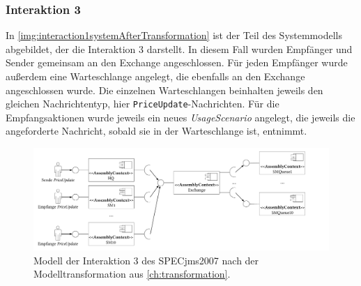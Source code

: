 \subsubsection{Interaktion 3}
In \autoref{img:interaction1systemAfterTransformation} ist der Teil des Systemmodells abgebildet, der die Interaktion 3 darstellt. In diesem Fall wurden Empfänger und Sender gemeinsam an den Exchange angeschlossen. Für jeden Empfänger wurde außerdem eine Warteschlange angelegt, die ebenfalls an den Exchange angeschlossen wurde. Die einzelnen Warteschlangen beinhalten jeweils den gleichen Nachrichtentyp, hier \texttt{PriceUpdate}-Nachrichten. Für die Empfangsaktionen wurde jeweils ein neues \emph{UsageScenario} angelegt, die jeweils die angeforderte Nachricht, sobald sie in der Warteschlange ist, entnimmt.
\begin{figure}
\center
  \includegraphics[width=1.4\textwidth,angle=90]{images/evaluation/specjms/evaluationInteraktion3new.pdf}
  \caption{Modell der Interaktion 3 des SPECjms2007 nach der Modelltransformation aus \autoref{ch:transformation}.}
  \label{img:interaction3systemAfterTransformation}
\end{figure}


